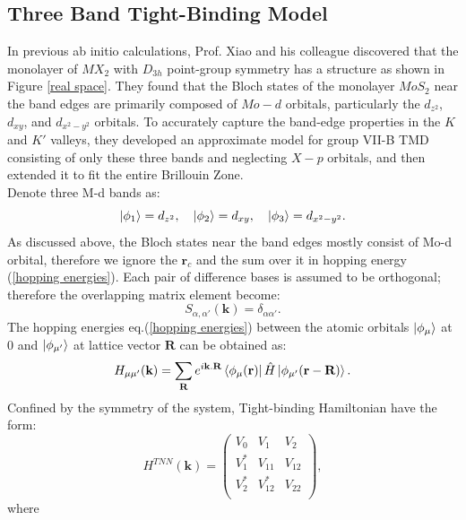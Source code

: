 \documentclass[12pt,english,a4paper]{article}
\begin{document}
	\subsection{Three Band Tight-Binding Model}
	\quad In previous ab initio calculations\cite{xiao_coupled_2012,mattheiss_band_1973,lebegue_electronic_2009,zhu_giant_2011,ataca_stable_2012}, Prof. Xiao and his colleague discovered that the monolayer of $MX_2$ with $D_{3h}$ point-group symmetry has a structure as shown in Figure \ref{real space}. They found that the Bloch states of the monolayer $MoS_2$ near the band edges are primarily composed of $Mo-d$ orbitals, particularly the $d_{z^2}$, $d_{xy}$, and $d_{x^2-y^2}$ orbitals. To accurately capture the band-edge properties in the $K$ and $K'$ valleys, they developed an approximate model for group VII-B TMD consisting of only these three bands and neglecting $X-p$ orbitals, and then extended it to fit the entire Brillouin Zone\cite{liu_three-band_2013}.\\\null
	\quad Denote three M-d bands as:
	\begin{equation}
		\ket{\phi_{1}} = d_{z^2},\quad \ket{\phi_2} = d_{xy}, \quad \ket{\phi_3} = d_{x^2- y^2}.
	\end{equation}
	\quad As discussed above, the Bloch states near the band edges mostly consist of Mo-d orbital, therefore we ignore the $\textbf{r}_c$ and the sum over it in hopping energy (\ref{hopping energies}). Each pair of difference bases is assumed to be orthogonal; therefore the overlapping matrix element become:
	$$S_{\alpha, \alpha'}(\textbf{k}) = \delta_{\alpha \alpha'}.$$
	\quad The hopping energies eq.(\ref{hopping energies}) between the atomic orbitals $\ket{\phi_{\mu}}$ at 0 and $\ket{\phi_{\mu'}}$ at lattice vector $\textbf{R}$ can be obtained as: $$H_{\mu \mu'}(\textbf{k}) =\sum_{\textbf{R}} e^{i\textbf{k}.\textbf{R}}  \bra{\phi_{\mu}(\textbf{r})}  \hat{H} \ket{\phi_{\mu'}(\textbf{r}-\textbf{R})}.$$
	\quad Confined by the symmetry of the system, Tight-binding Hamiltonian have the form:
	\begin{equation}
		H^{TNN}(\textbf{k}) =
		\begin{pmatrix}
			V_0  & V_1   & V_2 \\
			V_1^*& V_{11}& V_{12} \\
			V_2^*& V_{12}^* & V_{22} \\
		\end{pmatrix},
	\end{equation}
	where
\end{document}
